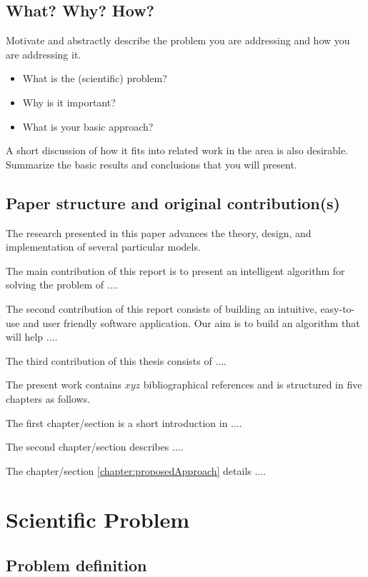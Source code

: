 \documentclass[runningheads,a4paper,11pt]{report}
\begin{document}
\section{What? Why? How?}
\label{section:what}

Motivate and abstractly describe the problem you are addressing and how you are addressing it. 
\begin{itemize}
	\item What is the (scientific) problem? 
	\item Why is it important? 
	\item What is your basic approach? 
\end{itemize}

A short discussion of how it fits into related work in the area is also desirable. Summarize the basic results and conclusions that you will present. 


\section{Paper structure and original contribution(s)}
\label{section:structure}

The research presented in this paper advances the theory, design, and implementation of several particular models. 

The main contribution of this report is to present an intelligent algorithm for solving the problem of $\ldots$.

The second contribution of this report consists of building an intuitive, easy-to-use and user
friendly software application. Our aim is to build an algorithm that will help $\ldots$.

The third contribution of this thesis consists of $\ldots$.


The present work contains $xyz$ bibliographical references and is structured in five chapters as follows.

The first chapter/section is a short introduction in $\ldots$.

The second chapter/section describes $\ldots$.

The chapter/section \ref{chapter:proposedApproach} details $\ldots$.



\chapter{Scientific Problem}
\label{section:scientificProblem}


\section{Problem definition}
\label{section:problemDefinition}
\end{document}
